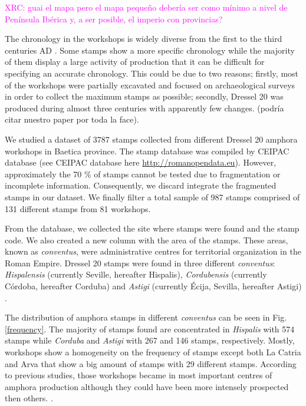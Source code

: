 \documentclass[review]{elsarticle}
\newcommand{\memo}[2]{\textcolor{#1}{#2}}
\newcommand{\xavi}[1]{\memo{magenta}{XRC: #1\\}}
\begin{document}
\xavi{guai el mapa pero el mapa pequeño debería ser como mínimo a nivel de Península Ibérica y, a ser posible, el imperio con provincias?}

The chronology in the workshops is widely diverse from the first to the third centuries AD \citep{millet_anforas_1998,rodriguez_baetican_1998,chic2005comercio}. Some stamps show a more specific chronology while the majority of them display a large activity of production that it can be difficult for specifying an accurate chronology. This could be due to two reasons; firstly, most of the workshops were partially excavated and focused on archaeological surveys in order to collect the maximum stamps as possible; secondly, Dressel 20 was produced during almost three centuries with apparently few changes. (podría citar nuestro paper por toda la face).
 
We studied a dataset of 3787 stamps collected from different Dressel 20 amphora workshops in Baetica province. The stamp database was compiled by CEIPAC database \citep{remesal_centro_2015} (see CEIPAC database here \url{http://romanopendata.eu}). However, approximately the 70 \% of stamps cannot be tested due to fragmentation or incomplete information. Consequently, we discard integrate the fragmented stamps in our dataset. We finally filter a total sample of 987 stamps comprised of 131 different stamps from 81 workshops. 

From the database, we collected the site where stamps were found and the stamp code. We also created a new column with the area of the stamps. These areas, known as \textit{conventus}, were administrative centres for territorial organization in the Roman Empire. Dressel 20 stamps were found in three different \textit{conventus}: \textit{Hispalensis} (currently Seville, hereafter Hispalis), \textit{Cordubensis} (currently C\'ordoba, hereafter Corduba) and \textit{Astigi} (currently Écija, Sevilla, hereafter Astigi) \citep{rodriguez_economioleicola_1977,chic_datos_2001,berni_millet_epigrafianforica_2008} .

The distribution of amphora stamps in different \textit{conventus} can be seen in Fig. \ref{frequency}. The majority of stamps found are concentrated in \textit{Hispalis} with 574 stamps while \textit{Corduba} and \textit{Astigi} with 267 and 146 stamps, respectively. Mostly, workshops show a homogeneity on the frequency of stamps except both La Catria and Arva that show a big amount of stamps with 29 different stamps. According to previous studies, those workshops became in most important centres of amphora production although they could have been more intensely prospected then others. \citep{arva_1997}.
 
\end{document}
